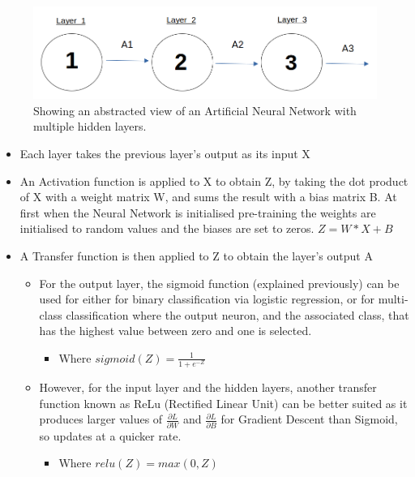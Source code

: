 \documentclass[./project-report/src/latex/project-report.tex]{subfiles}
\begin{document}
\pagebreak

\begin{figure}[h!]
\centering
\includegraphics[width=1\textwidth]{./project-report/src/images/deep-ann-diagram.png}
\caption{Showing an abstracted view of an Artificial Neural Network with multiple hidden layers.}
\label{fig:abstract-network}
\end{figure}

\begin{itemize}
    \item Each layer takes the previous layer's output as its input X
    \item An Activation function is applied to X to obtain Z, by taking the dot product of X with a weight matrix W, and sums the result with a bias matrix B. At 
          first when the Neural Network is initialised pre-training the weights are initialised to random values and the biases are set to zeros.
          $Z = W * X + B$
    \item A Transfer function is then applied to Z to obtain the layer's output A
    \begin{itemize}
        \item For the output layer, the sigmoid function (explained previously) can be used for either for binary classification via logistic regression, or for multi-
              class classification where the output neuron, and the associated class, that has the highest value between zero and one is selected.
        \begin{itemize}
            \item Where $sigmoid(Z) = \frac{1}{1+e^{-Z}}$
        \end{itemize}
        \item However, for the input layer and the hidden layers, another transfer function known as ReLu (Rectified Linear Unit) can be better suited as it produces 
              larger values of $\frac{\partial{L}}{\partial{W}}$ and $\frac{\partial{L}}{\partial{B}}$ for Gradient Descent than Sigmoid, so updates at a quicker rate.
        \begin{itemize}
            \item Where $relu(Z) = max(0, Z)$
        \end{itemize}
    \end{itemize}
\end{itemize}
\end{document}
